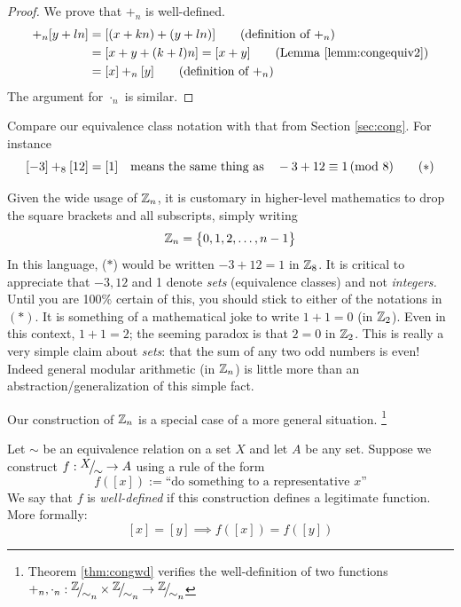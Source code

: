 \begin{proof}
	We prove that $+_n$ is well-defined.
	\begin{align*}
		[x+kn]+_n[y+ln]
		&=[(x+kn)+(y+ln)] \tag{definition of $+_n$}\\
		&=[x+y+(k+l)n] =[x+y] \tag{Lemma \ref{lemm:congequiv2}}\\
		&=[x]+_n[y] \tag{definition of $+_n$}
	\end{align*}
	The argument for $\cdot_n$ is similar.
\end{proof}


Compare our equivalence class notation with that from Section \ref{sec:cong}. For instance
\[
	[-3]+_8[12]=[1] \quad \text{means the same thing as} \quad -3+12\equiv 1\negthickspace\pmod{8} \tag{$\ast$}
\]


\begin{aside}{}{}
	Given the wide usage of $\mathbb{Z}_n$, it is customary in higher-level mathematics to drop the square brackets and all subscripts, simply writing
	\[
		\mathbb{Z}_n=\bigl\{0,1,2,\ldots,n-1\bigr\}
	\]
	In this language, ($\ast$) would be written $-3+12=1$ in $\mathbb{Z}_8$. It is critical to appreciate that $-3,12$ and 1 denote \emph{sets} (equivalence classes) and not \emph{integers.} Until you are 100\% certain of this, you should stick to either of the notations in $(\ast)$.\smallbreak
	It is something of a mathematical joke to write $1+1=0$ (in $\mathbb{Z}_2$). Even in this context, $1+1=2$; the seeming paradox is that $2=0$ in $\mathbb{Z}_2$. This is really a very simple claim about \emph{sets}: that the sum of any two odd numbers is even! Indeed general modular arithmetic (in $\mathbb{Z}_n$) is little more than an abstraction/generalization of this simple fact. 
\end{aside}


\goodbreak



Our construction of $\mathbb{Z}_n$ is a special case of a more general situation.%
\footnote{Theorem \ref{thm:congwd} verifies the well-definition of two functions $+_n,\cdot_n:\quotient\Z{\sim_n}\times\quotient\Z{\sim_n}\to\quotient\Z{\sim_n}$}

\begin{defn}{}{}
	Let $\sim$ be an equivalence relation on a set $X$ and let $A$ be any set. Suppose we construct $f:\quotient X\sim\to A$ using a rule of the form
	\[
		f([x]):= \text{``do something to a representative $x$''}
	\]
	We say that $f$ is \emph{well-defined} if this construction defines a legitimate function. More formally:
	\[
		[x]=[y] \implies f([x])=f([y])
	\]
\end{defn}



